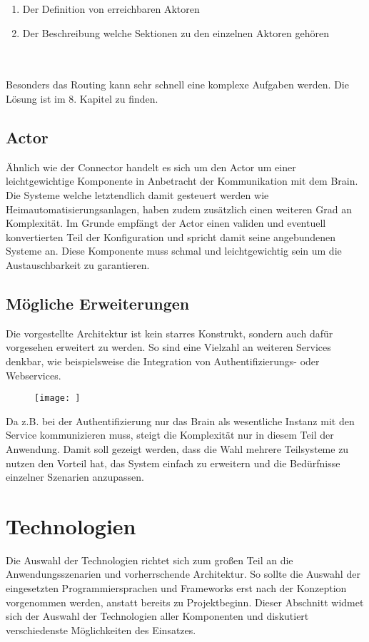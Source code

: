 \begin{enumerate}
     \item Der Definition von erreichbaren Aktoren
     \item Der Beschreibung welche Sektionen zu den einzelnen Aktoren gehören
   \end{enumerate}
\\\\
Besonders das Routing kann sehr schnell eine komplexe Aufgaben werden. Die Lösung ist im 8. Kapitel zu finden.

\subsection{Actor}
Ähnlich wie der Connector handelt es sich um den Actor um einer leichtgewichtige Komponente in Anbetracht der Kommunikation mit dem Brain. Die Systeme welche letztendlich damit gesteuert werden wie Heimautomatisierungsanlagen, haben zudem zusätzlich einen weiteren Grad an Komplexität. 
Im Grunde empfängt der Actor einen validen und eventuell konvertierten Teil der Konfiguration und spricht damit seine angebundenen Systeme an. Diese Komponente muss schmal und leichtgewichtig sein um die Austauschbarkeit zu garantieren.

\subsection{Mögliche Erweiterungen}
Die vorgestellte Architektur ist kein starres Konstrukt, sondern auch dafür vorgesehen erweitert zu werden. So sind eine Vielzahl an weiteren Services denkbar, wie beispielsweise die Integration von Authentifizierungs- oder Webservices. 

\begin{figure}[H]
\texttt{[image: ]}
\caption{}
\end{figure}

Da z.B. bei der Authentifizierung nur das Brain als wesentliche Instanz mit den Service kommunizieren muss, steigt die Komplexität nur in diesem Teil der Anwendung. Damit soll gezeigt werden, dass die Wahl mehrere Teilsysteme zu nutzen den Vorteil hat, das System einfach zu erweitern und die Bedürfnisse einzelner Szenarien anzupassen. 

\section{Technologien}
Die Auswahl der Technologien richtet sich zum großen Teil an die Anwendungsszenarien und vorherrschende Architektur. So sollte die Auswahl der eingesetzten Programmiersprachen und Frameworks erst nach der Konzeption vorgenommen werden, anstatt bereits zu Projektbeginn. Dieser Abschnitt widmet sich der Auswahl der Technologien aller Komponenten und diskutiert verschiedenste Möglichkeiten des Einsatzes. 

